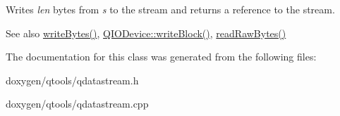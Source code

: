 Writes {\itshape len} bytes from {\itshape s} to the stream and returns a reference to the stream.

\begin{DoxySeeAlso}{See also}
\mbox{\hyperlink{class_q_data_stream_a8f1af77d483ecfd515c9eac3822aaaa5}{write\+Bytes()}}, \mbox{\hyperlink{class_q_i_o_device_a5d937df1bde2f956872dd54e077807d1}{Q\+I\+O\+Device\+::write\+Block()}}, \mbox{\hyperlink{class_q_data_stream_a04938bc54d1158276cf01be169d159ea}{read\+Raw\+Bytes()}} 
\end{DoxySeeAlso}


The documentation for this class was generated from the following files\+:\begin{DoxyCompactItemize}
\item 
doxygen/qtools/qdatastream.\+h\item 
doxygen/qtools/qdatastream.\+cpp\end{DoxyCompactItemize}
